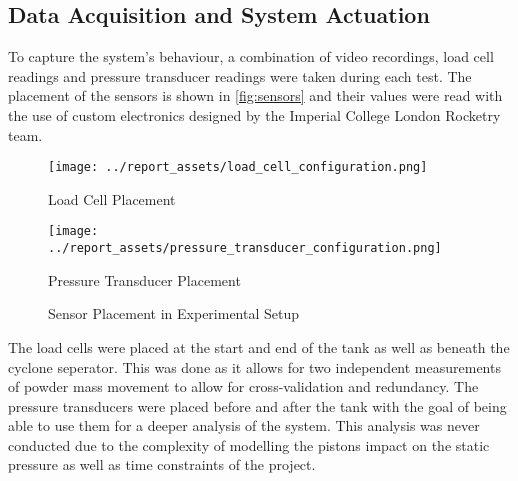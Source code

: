 \subsection{Data Acquisition and System Actuation}
To capture the system's behaviour, a combination of video recordings, load cell readings and pressure transducer readings were taken during each test. The placement of the sensors is shown in \autoref{fig:sensors} and their values were read with the use of custom electronics designed by the Imperial College London Rocketry team.
\begin{figure}[htbp]
    \centering

    \begin{minipage}{0.45\textwidth}
        \centering
        \texttt{[image: ../report\_assets/load\_cell\_configuration.png]}
        \caption*{Load Cell Placement}
    \end{minipage}
    \hfill
    \begin{minipage}{0.45\textwidth}
        \centering
        \texttt{[image: ../report\_assets/pressure\_transducer\_configuration.png]}
        \caption*{Pressure Transducer Placement}
    \end{minipage}
    \caption{Sensor Placement in Experimental Setup}\label{fig:sensors}
\end{figure}
The load cells were placed at the start and end of the tank as well as beneath the cyclone seperator. This was done as it allows for two independent measurements of powder mass movement to allow for cross-validation and redundancy. The pressure transducers were placed before and after the tank with the goal of being able to use them for a deeper analysis of the system. This analysis was never conducted due to the complexity of modelling the pistons impact on the static pressure as well as time constraints of the project.

